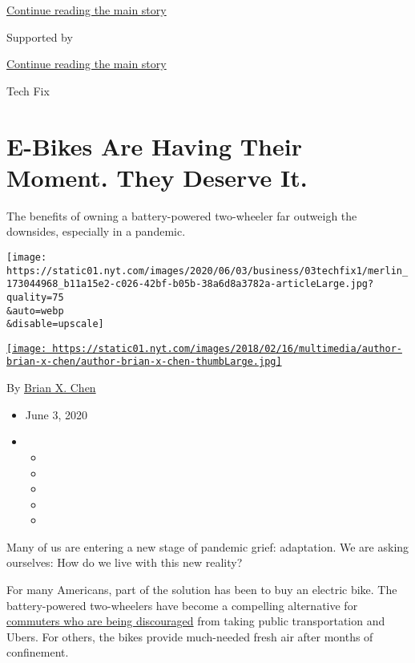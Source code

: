 \protect\hyperlink{after-top}{Continue reading the main story}

Supported by

\protect\hyperlink{after-sponsor}{Continue reading the main story}

Tech Fix

\hypertarget{e-bikes-are-having-their-moment-they-deserve-it}{%
\section{E-Bikes Are Having Their Moment. They Deserve
It.}\label{e-bikes-are-having-their-moment-they-deserve-it}}

The benefits of owning a battery-powered two-wheeler far outweigh the
downsides, especially in a pandemic.

\texttt{[image: https://static01.nyt.com/images/2020/06/03/business/03techfix1/merlin\_173044968\_b11a15e2-c026-42bf-b05b-38a6d8a3782a-articleLarge.jpg?quality=75\\\&auto=webp\\\&disable=upscale]}

\href{https://www.nytimes.com/by/brian-x-chen}{\texttt{[image: https://static01.nyt.com/images/2018/02/16/multimedia/author-brian-x-chen/author-brian-x-chen-thumbLarge.jpg]}}

By \href{https://www.nytimes.com/by/brian-x-chen}{Brian X. Chen}

\begin{itemize}
\item
  June 3, 2020
\item
  \begin{itemize}
  \item
  \item
  \item
  \item
  \item
  \end{itemize}
\end{itemize}

Many of us are entering a new stage of pandemic grief: adaptation. We
are asking ourselves: How do we live with this new reality?

For many Americans, part of the solution has been to buy an electric
bike. The battery-powered two-wheelers have become a compelling
alternative for
\href{https://www.nytimes.com/2020/05/28/health/cdc-coronavirus-offices.html?action=click\&module=Top\%20Stories\&pgtype=Homepage}{commuters
who are being discouraged} from taking public transportation and Ubers.
For others, the bikes provide much-needed fresh air after months of
confinement.


